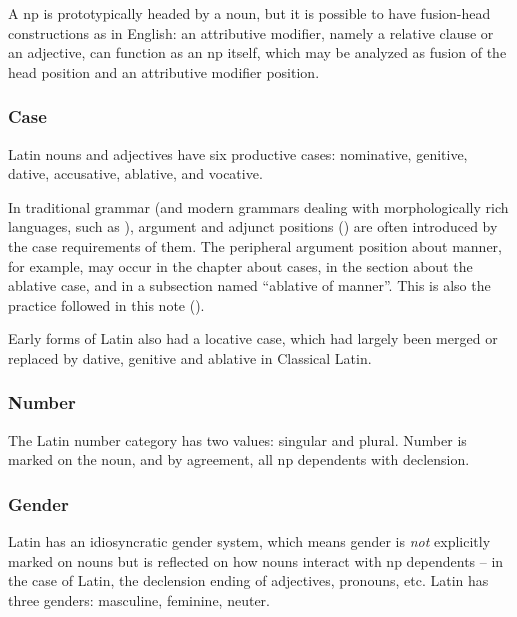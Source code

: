 \documentclass{article}
\newcommand*{\citechap}[1]{chap.~{#1}}
\begin{document}
A \ac{np} is prototypically headed by a noun, 
but it is possible to have fusion-head constructions as in English:
an attributive modifier, namely a relative clause or an adjective, 
can function as an \ac{np} itself,
which may be analyzed as fusion of the head position and an attributive modifier position.


\subsubsection{Case}\label{sec:case-abs}

Latin nouns and adjectives have six productive cases:
nominative, genitive, dative, accusative, ablative, and vocative.

In traditional grammar (and modern grammars dealing with morphologically rich languages,
such as \citet[\citechap{8}]{jacques2021grammar}), 
argument and adjunct positions () 
are often introduced by the case requirements of them.
The peripheral argument position about manner, for example,
may occur in the chapter about cases, in the section about the ablative case,
and in a subsection named ``ablative of manner''.
This is also the practice followed in this note ().

Early forms of Latin also had a locative case, which had largely been merged or replaced by 
dative, genitive and ablative in Classical Latin.

\subsubsection{Number}

The Latin number category has two values: singular and plural.
Number is marked on the noun, and by agreement, all \ac{np} dependents with declension.

\subsubsection{Gender}

Latin has an idiosyncratic gender system, 
which means gender is \emph{not} explicitly marked on nouns
but is reflected on how nouns interact with \ac{np} dependents
-- in the case of Latin, the declension ending of adjectives, pronouns, etc. 
Latin has three genders: masculine, feminine, neuter.
\end{document}
